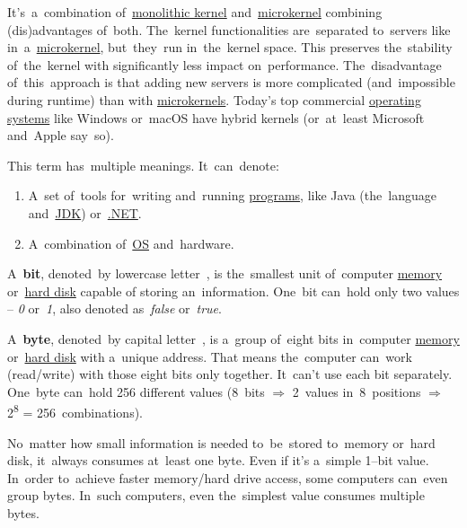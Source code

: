 \label{hybridkernel}
It's~a~combination of~\hyperref[monolithickernel]{monolithic kernel} and~\hyperref[microkernel]{microkernel} combining (dis)advantages of~both.
The~kernel functionalities are~separated to~servers like in~a~\hyperref[microkernel]{microkernel}, but~they~run in~the~kernel space.
This preserves the~stability of~the~kernel with significantly less impact on~performance.
The~disadvantage of~this~approach is that adding new servers is more complicated (and~impossible during runtime) than with \hyperref[microkernel]{microkernels}.
Today's top commercial \hyperref[os]{operating systems} like Windows or~macOS have hybrid kernels (or~at~least Microsoft and~Apple say~so).

\label{platform}
This term has~multiple meanings.
It~can~denote:
\begin{enumerate}[label=\arabic*)]
    \item A~set of~tools for~writing and~running \hyperref[applicationprocessprogramservicethread]{programs}, like Java (the~language and~\hyperref[jdkjrejvm]{JDK}) or~\hyperref[dotnet]{.NET}.
    \item A~combination of~\hyperref[os]{OS} and~hardware.
\end{enumerate}

\label{bitsandbytes}
A~\textbf{bit}, denoted~by lowercase letter~, is the~smallest unit of~computer \hyperref[systemmemory]{memory} or~\hyperref[harddiskdrive]{hard disk} capable of storing an~information.
One~bit can~hold only two values -- \textit{0} or~\textit{1}, also denoted as~\textit{false} or~\textit{true}.

A~\textbf{byte}, denoted~by capital letter~, is a~group of~eight bits in~computer \hyperref[systemmemory]{memory} or~\hyperref[harddiskdrive]{hard disk} with a~unique address.
That means the~computer can~work (read/write) with those eight bits only together.
It~can't use each bit separately.
One~byte can~hold 256 different values (8~bits $\Rightarrow$ 2~values in~8~positions $\Rightarrow$ 2\textsuperscript{8} = 256~combinations).

No~matter how small information is needed to~be~stored to~memory or~hard disk, it~always consumes at~least one byte.
Even if it's a~simple \mbox{1--bit}  value.
In~order to~achieve faster memory/hard drive access, some computers can~even group bytes.
In~such computers, even the~simplest  value consumes multiple bytes.

